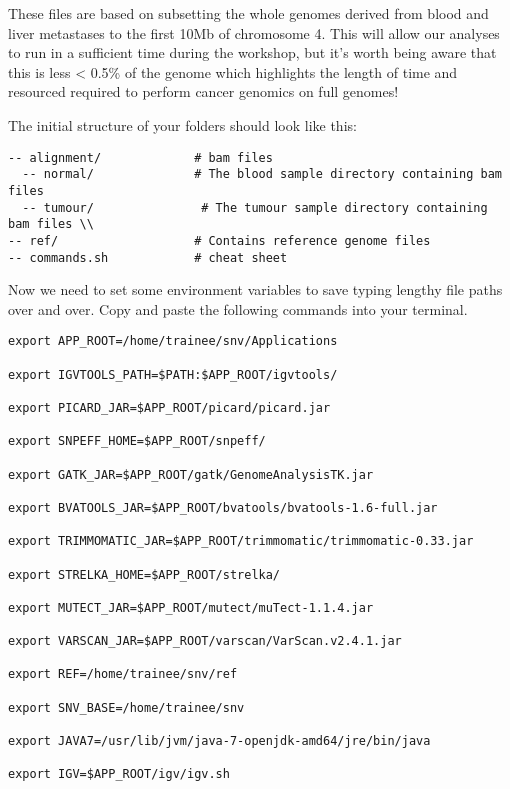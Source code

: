 These files are based on subsetting the whole genomes derived from blood and liver metastases to the first 10Mb of chromosome 4. This will allow our analyses to run in a sufficient time during the workshop, but it's worth being aware that this is less < 0.5\% of the genome which highlights the length of time and resourced required to perform cancer genomics on full genomes!

The initial structure of your folders should look like this:

\begin{verbatim}
-- alignment/	          # bam files 
  -- normal/              # The blood sample directory containing bam files 
  -- tumour/               # The tumour sample directory containing bam files \\
-- ref/                   # Contains reference genome files	     
-- commands.sh            # cheat sheet 
\end{verbatim}



\begin{steps}
Now we need to set some environment variables to save typing lengthy file paths over and over. Copy and paste the following commands into your terminal.
\begin{lstlisting}
export APP_ROOT=/home/trainee/snv/Applications

export IGVTOOLS_PATH=$PATH:$APP_ROOT/igvtools/

export PICARD_JAR=$APP_ROOT/picard/picard.jar

export SNPEFF_HOME=$APP_ROOT/snpeff/

export GATK_JAR=$APP_ROOT/gatk/GenomeAnalysisTK.jar

export BVATOOLS_JAR=$APP_ROOT/bvatools/bvatools-1.6-full.jar

export TRIMMOMATIC_JAR=$APP_ROOT/trimmomatic/trimmomatic-0.33.jar

export STRELKA_HOME=$APP_ROOT/strelka/

export MUTECT_JAR=$APP_ROOT/mutect/muTect-1.1.4.jar

export VARSCAN_JAR=$APP_ROOT/varscan/VarScan.v2.4.1.jar 

export REF=/home/trainee/snv/ref

export SNV_BASE=/home/trainee/snv

export JAVA7=/usr/lib/jvm/java-7-openjdk-amd64/jre/bin/java

export IGV=$APP_ROOT/igv/igv.sh
\end{lstlisting}
\end{steps}

